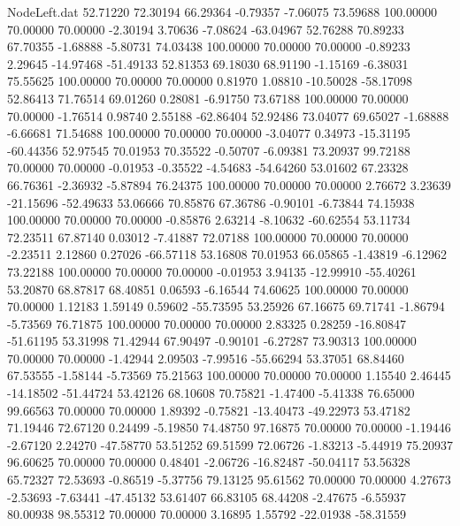 \begin{filecontents}{NodeLeft.dat}
  52.71220   72.30194   66.29364    -0.79357   -7.06075   73.59688  100.00000   70.00000   70.00000   -2.30194    3.70636   -7.08624  -63.04967
  52.76288   70.89233   67.70355    -1.68888   -5.80731   74.03438  100.00000   70.00000   70.00000   -0.89233    2.29645  -14.97468  -51.49133
  52.81353   69.18030   68.91190    -1.15169   -6.38031   75.55625  100.00000   70.00000   70.00000    0.81970    1.08810  -10.50028  -58.17098
  52.86413   71.76514   69.01260     0.28081   -6.91750   73.67188  100.00000   70.00000   70.00000   -1.76514    0.98740    2.55188  -62.86404
  52.92486   73.04077   69.65027    -1.68888   -6.66681   71.54688  100.00000   70.00000   70.00000   -3.04077    0.34973  -15.31195  -60.44356
  52.97545   70.01953   70.35522    -0.50707   -6.09381   73.20937   99.72188   70.00000   70.00000   -0.01953   -0.35522   -4.54683  -54.64260
  53.01602   67.23328   66.76361    -2.36932   -5.87894   76.24375  100.00000   70.00000   70.00000    2.76672    3.23639  -21.15696  -52.49633
  53.06666   70.85876   67.36786    -0.90101   -6.73844   74.15938  100.00000   70.00000   70.00000   -0.85876    2.63214   -8.10632  -60.62554
  53.11734   72.23511   67.87140     0.03012   -7.41887   72.07188  100.00000   70.00000   70.00000   -2.23511    2.12860    0.27026  -66.57118
  53.16808   70.01953   66.05865    -1.43819   -6.12962   73.22188  100.00000   70.00000   70.00000   -0.01953    3.94135  -12.99910  -55.40261
  53.20870   68.87817   68.40851     0.06593   -6.16544   74.60625  100.00000   70.00000   70.00000    1.12183    1.59149    0.59602  -55.73595
  53.25926   67.16675   69.71741    -1.86794   -5.73569   76.71875  100.00000   70.00000   70.00000    2.83325    0.28259  -16.80847  -51.61195
  53.31998   71.42944   67.90497    -0.90101   -6.27287   73.90313  100.00000   70.00000   70.00000   -1.42944    2.09503   -7.99516  -55.66294
  53.37051   68.84460   67.53555    -1.58144   -5.73569   75.21563  100.00000   70.00000   70.00000    1.15540    2.46445  -14.18502  -51.44724
  53.42126   68.10608   70.75821    -1.47400   -5.41338   76.65000   99.66563   70.00000   70.00000    1.89392   -0.75821  -13.40473  -49.22973
  53.47182   71.19446   72.67120     0.24499   -5.19850   74.48750   97.16875   70.00000   70.00000   -1.19446   -2.67120    2.24270  -47.58770
  53.51252   69.51599   72.06726    -1.83213   -5.44919   75.20937   96.60625   70.00000   70.00000    0.48401   -2.06726  -16.82487  -50.04117
  53.56328   65.72327   72.53693    -0.86519   -5.37756   79.13125   95.61562   70.00000   70.00000    4.27673   -2.53693   -7.63441  -47.45132
  53.61407   66.83105   68.44208    -2.47675   -6.55937   80.00938   98.55312   70.00000   70.00000    3.16895    1.55792  -22.01938  -58.31559

\end{filecontents}
